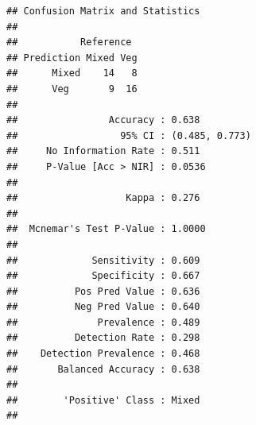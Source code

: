 \documentclass[
]{book}
\newenvironment{Shaded}{\begin{snugshade}}{\end{snugshade}}
\newcommand{\AttributeTok}[1]{\textcolor[rgb]{0.77,0.63,0.00}{#1}}
\newcommand{\CommentTok}[1]{\textcolor[rgb]{0.56,0.35,0.01}{\textit{#1}}}
\newcommand{\ControlFlowTok}[1]{\textcolor[rgb]{0.13,0.29,0.53}{\textbf{#1}}}
\newcommand{\DecValTok}[1]{\textcolor[rgb]{0.00,0.00,0.81}{#1}}
\newcommand{\FloatTok}[1]{\textcolor[rgb]{0.00,0.00,0.81}{#1}}
\newcommand{\FunctionTok}[1]{\textcolor[rgb]{0.00,0.00,0.00}{#1}}
\newcommand{\NormalTok}[1]{#1}
\newcommand{\OtherTok}[1]{\textcolor[rgb]{0.56,0.35,0.01}{#1}}
\newcommand{\SpecialCharTok}[1]{\textcolor[rgb]{0.00,0.00,0.00}{#1}}
\newcommand{\StringTok}[1]{\textcolor[rgb]{0.31,0.60,0.02}{#1}}
\begin{document}
\begin{Shaded}
\end{Shaded}

\begin{verbatim}
## Confusion Matrix and Statistics
## 
##           Reference
## Prediction Mixed Veg
##      Mixed    14   8
##      Veg       9  16
##                                         
##                Accuracy : 0.638         
##                  95% CI : (0.485, 0.773)
##     No Information Rate : 0.511         
##     P-Value [Acc > NIR] : 0.0536        
##                                         
##                   Kappa : 0.276         
##                                         
##  Mcnemar's Test P-Value : 1.0000        
##                                         
##             Sensitivity : 0.609         
##             Specificity : 0.667         
##          Pos Pred Value : 0.636         
##          Neg Pred Value : 0.640         
##              Prevalence : 0.489         
##          Detection Rate : 0.298         
##    Detection Prevalence : 0.468         
##       Balanced Accuracy : 0.638         
##                                         
##        'Positive' Class : Mixed         
## 
\end{verbatim}
\end{document}
